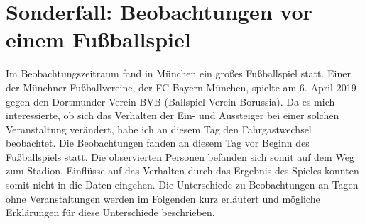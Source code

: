 \section{Sonderfall: Beobachtungen vor einem Fußballspiel} \label{Fussballspiel}
Im Beobachtungszeitraum fand in München ein großes Fußballspiel statt. Einer der Münchner Fußballvereine, der FC Bayern München, spielte am 6. April 2019 gegen den Dortmunder Verein BVB (Ballspiel-Verein-Borussia). Da es mich interessierte, ob sich das Verhalten der Ein- und Aussteiger bei einer solchen Veranstaltung verändert, habe ich an diesem Tag den Fahrgastwechsel beobachtet. Die Beobachtungen fanden an diesem Tag vor Beginn des Fußballspiels statt. Die observierten Personen befanden sich somit auf dem Weg zum Stadion. Einflüsse auf das Verhalten durch das Ergebnis des Spieles konnten somit nicht in die Daten eingehen. Die Unterschiede zu Beobachtungen an Tagen ohne Veranstaltungen werden im Folgenden kurz erläutert und mögliche Erklärungen für diese Unterschiede beschrieben. 
